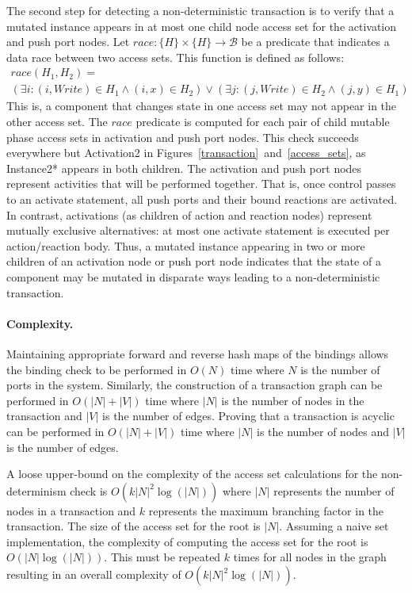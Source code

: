 The second step for detecting a non-deterministic transaction is to verify that a mutated instance appears in at most one child node access set for the activation and push port nodes.
Let $\mathit{race}: \{ H \} \times \{ H \} \to \mathcal{B}$ be a predicate that indicates a data race between two access sets.
This function is defined as follows:
\begin{multline}
  \mathit{race} (H_1, H_2) = \\
  (\exists i : (i, \mathit{Write}) \in H_1 \land (i, x) \in H_2) \lor
  (\exists j : (j, \mathit{Write}) \in H_2 \land (j, y) \in H_1)
\end{multline}
This is, a component that changes state in one access set may not appear in the other access set.
The $\mathit{race}$ predicate is computed for each pair of child mutable phase access sets in activation and push port nodes.
This check succeeds everywhere but Activation2 in Figures~\ref{transaction}~and~\ref{access_sets}, as Instance2* appears in both children.
The activation and push port nodes represent activities that will be performed together.
That is, once control passes to an activate statement, all push ports and their bound reactions are activated.
In contrast, activations (as children of action and reaction nodes) represent mutually exclusive alternatives:  at most one activate statement is executed per action/reaction body.
Thus, a mutated instance appearing in two or more children of an activation node or push port node indicates that the state of a component may be mutated in disparate ways leading to a non-deterministic transaction.

\paragraph{Complexity.}
Maintaining appropriate forward and reverse hash maps of the bindings allows the binding check to be performed in $O(N)$ time where $N$ is the number of ports in the system.
Similarly, the construction of a transaction graph can be performed in $O(|N| + |V|)$ time where $|N|$ is the number of nodes in the transaction and $|V|$ is the number of edges.
Proving that a transaction is acyclic can be performed in $O(|N| + |V|)$ time where $|N|$ is the number of nodes and $|V|$ is the number of edges.

A loose upper-bound on the complexity of the access set calculations for the non-determinism check is $O(k |N|^2 \log (|N|))$ where $|N|$ represents the number of nodes in a transaction and $k$ represents the maximum branching factor in the transaction.
The size of the access set for the root is $|N|$.
Assuming a naive set implementation, the complexity of computing the access set for the root is $O(|N| \log (|N|))$.
This must be repeated $k$ times for all nodes in the graph resulting in an overall complexity of $O(k |N|^2 \log (|N|))$.

